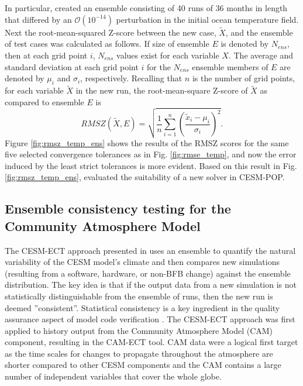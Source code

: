 \documentclass[gmd, manuscript]{copernicus}
\begin{document}
In particular, \cite{yong2015} created an ensemble consisting of 40 runs of 36 months in length that differed by an $\mathcal{O}(10^{-14})$ perturbation in the initial ocean temperature field.  Next the root-mean-squared Z-score between the new case, $\tilde{{X}}$, and the ensemble of test cases was calculated as follows.  If size of ensemble $E$ is denoted by $N_{ens}$, then at each grid point $i$, $N_{ens}$ values exist for each variable $X$.  The average and standard deviation at each grid point $i$ for the $N_{ens}$ ensemble members of $E$ are denoted by $\mu_i$ and $\sigma_i$, respectively.  Recalling that $n$ is the number of grid points, for each variable $\tilde{{X}}$ in the new run, the root-mean-square Z-score of $\tilde{X}$ as compared to ensemble $E$ is \begin{equation}
 RMSZ(\tilde{X}, E) = \sqrt{\frac{1}{n}\sum_{i=1}^n(\frac{\tilde{x}_i -\mu_i}{\sigma_i})^2}. 
\label{e:rmsz}
\end{equation}
Figure \ref{fig:rmsz_temp_ens} shows the results of the RMSZ scores for the same five selected convergence tolerances as in Fig. \ref{fig:rmse_temp}, and now the error induced by the least strict tolerances is more evident.   Based on this result in Fig. \ref{fig:rmsz_temp_ens}, \cite{yong2015}  evaluated the suitability of a new solver in CESM-POP.

\subsection{Ensemble consistency testing for the Community Atmosphere Model}

The CESM-ECT approach presented in \cite{baker2015} uses an ensemble to quantify the natural variability of the CESM model's climate and then compares new simulations (resulting from a software, hardware, or non-BFB change) against the ensemble distribution.  The key idea is that if the output data from a new simulation is not statistically distinguishable from the ensemble of runs, then the new run is deemed ''consistent''.  Statistical consistency is a key ingredient in the quality assurance aspect of model code verification \citep{oberkampf2010}.  The CESM-ECT approach was first applied to history output from the Community Atmosphere Model (CAM) component, resulting in the CAM-ECT tool.  CAM data were a logical first target as the time scales for changes to propagate throughout the atmosphere are shorter compared to other CESM components and the CAM contains a large number of independent variables that cover the whole globe.
\end{document}
